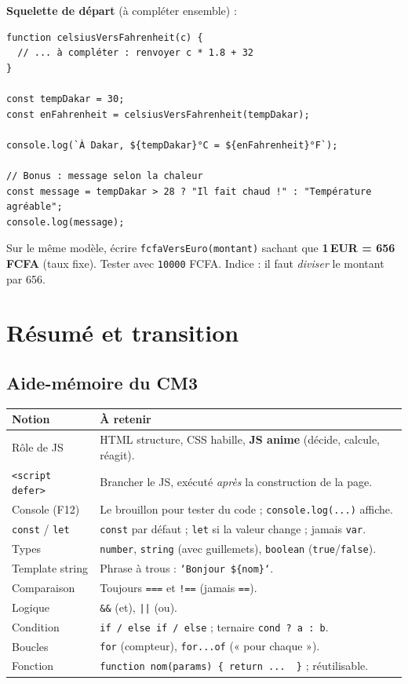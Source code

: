 \documentclass[11pt,a4paper]{article}
\newcommand{\code}[1]{\texttt{#1}}
\begin{document}
\textbf{Squelette de départ} (à compléter ensemble) :

\begin{lstlisting}[style=js]
function celsiusVersFahrenheit(c) {
  // ... à compléter : renvoyer c * 1.8 + 32
}

const tempDakar = 30;
const enFahrenheit = celsiusVersFahrenheit(tempDakar);

console.log(`À Dakar, ${tempDakar}°C = ${enFahrenheit}°F`);

// Bonus : message selon la chaleur
const message = tempDakar > 28 ? "Il fait chaud !" : "Température agréable";
console.log(message);
\end{lstlisting}

\begin{infobox}
Sur le même modèle, écrire \code{fcfaVersEuro(montant)} sachant que \textbf{1\,EUR = 656 FCFA} (taux fixe). Tester avec \code{10000} FCFA. Indice : il faut \emph{diviser} le montant par 656.
\end{infobox}

\section{Résumé et transition}

\subsection{Aide-mémoire du CM3}

\begin{center}
\begin{tabular}{p{4cm} p{8.5cm}}
\toprule
\textbf{Notion} & \textbf{À retenir} \\
\midrule
Rôle de JS & HTML structure, CSS habille, \textbf{JS anime} (décide, calcule, réagit). \\
\code{<script defer>} & Brancher le JS, exécuté \emph{après} la construction de la page. \\
Console (F12) & Le brouillon pour tester du code ; \code{console.log(...)} affiche. \\
\code{const} / \code{let} & \code{const} par défaut ; \code{let} si la valeur change ; jamais \code{var}. \\
Types & \code{number}, \code{string} (avec guillemets), \code{boolean} (\code{true}/\code{false}). \\
Template string & Phrase à trous : \code{`Bonjour \$\{nom\}`}. \\
Comparaison & Toujours \code{===} et \code{!==} (jamais \code{==}). \\
Logique & \code{\&\&} (et), \code{||} (ou). \\
Condition & \code{if / else if / else} ; ternaire \code{cond ? a : b}. \\
Boucles & \code{for} (compteur), \code{for...of} (« pour chaque »). \\
Fonction & \code{function nom(params) \{ return ...\, \}} ; réutilisable. \\
\bottomrule
\end{tabular}
\end{center}
\end{document}
